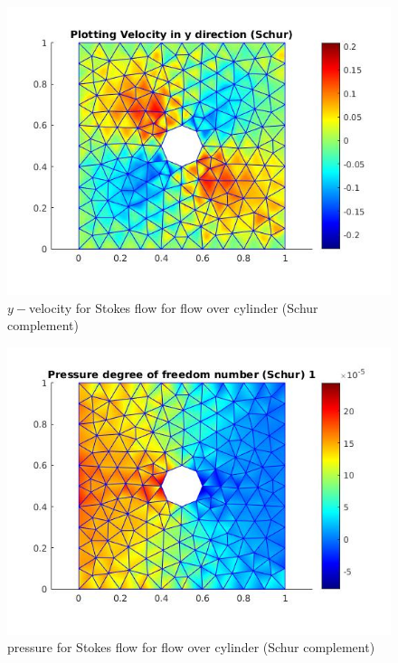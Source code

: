 \documentclass[a4paper,12pt]{book}
\begin{document}
\begin{figure}
  \includegraphics[width=\linewidth]{velocity_Y_schur.jpg}
  \caption{$y-$velocity for Stokes flow for flow over cylinder (Schur complement)}
  \label{fig:velocity_y_cylinder_stokes_schur}
\end{figure}

\begin{figure}
  \includegraphics[width=\linewidth]{pressure_Schur.jpg}
  \caption{pressure for Stokes flow for flow over cylinder (Schur complement)}
  \label{fig:pressure_cylinder_stokes_schur}
\end{figure}
\end{document}
